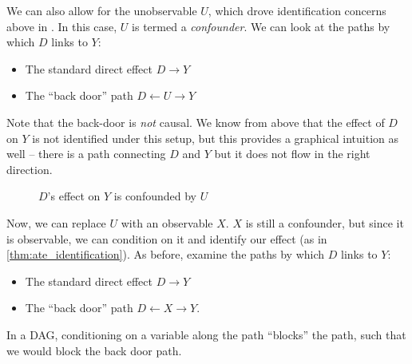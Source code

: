 \documentclass{tufte-handout}
\theoremstyle{break}
\begin{document}
  We can also allow for the unobservable $U$, which drove
  identification concerns above in . In this case, $U$ is termed a \emph{confounder}. We can look at the paths by which $D$ links to $Y$:
  \begin{itemize}
  \item The standard direct effect $D \rightarrow Y$
  \item The ``back door'' path $D \leftarrow U \rightarrow Y$
  \end{itemize}
 Note that the back-door is \emph{not} causal. We know from above that the effect of $D$ on $Y$ is not identified under this setup, but this provides a graphical intuition as well -- there is a path connecting $D$ and $Y$ but it does not flow in the right direction.

 \begin{figure}
\begin{center}
\end{center}
\caption{$D$'s effect on $Y$ is confounded by $U$}
\end{figure}

Now, we can replace $U$ with an observable $X$.  $X$ is still a confounder, but since it is observable, we can condition on it and identify our effect (as in \ref{thm:ate_identification}). As before, examine the paths by which $D$ links to $Y$:
\begin{itemize}
\item The standard direct effect $D \rightarrow Y$
\item The ``back door'' path $D \leftarrow X \rightarrow Y$.
\end{itemize}

In a DAG, conditioning on a variable along the path
``blocks'' the path, such that we would block the back door path. 
\end{document}
